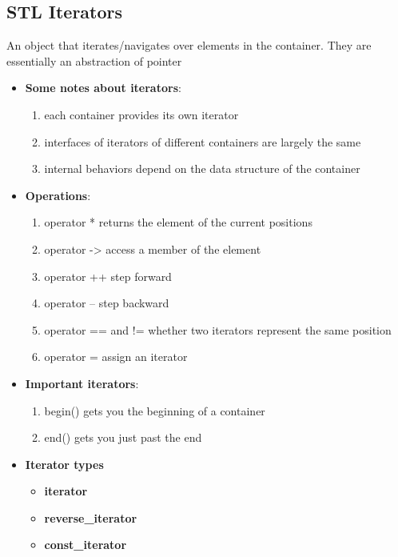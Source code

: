 \documentclass{report}
\begin{document}
   \subsection{STL Iterators}
    An object that iterates/navigates over elements in the container. They are essentially an abstraction of pointer
   \begin{itemize}
       \item \textbf{Some notes about iterators}: 
           \begin{enumerate}
               \item each container provides its own iterator
               \item interfaces of iterators of different containers are largely the same
               \item internal behaviors depend on the data structure of the container
           \end{enumerate}
       \item \textbf{Operations}: 
            \begin{enumerate}
                \item operator * returns the element of the current positions
                \item operator -> access a member of the element
                \item operator ++ step forward
                \item operator -- step backward
                \item operator == and != whether two iterators represent the same position
                \item operator = assign an iterator
            \end{enumerate}
        \item \textbf{Important iterators}:
            \begin{enumerate}
                \item begin() gets you the beginning of a container
                \item end() gets you just past the end
            \end{enumerate}
        \item \textbf{Iterator types}
            \begin{itemize}
                \item \textbf{iterator}
                \item \textbf{reverse\_iterator}
                \item \textbf{const\_iterator}

\end{itemize}
\end{itemize}
\end{document}
